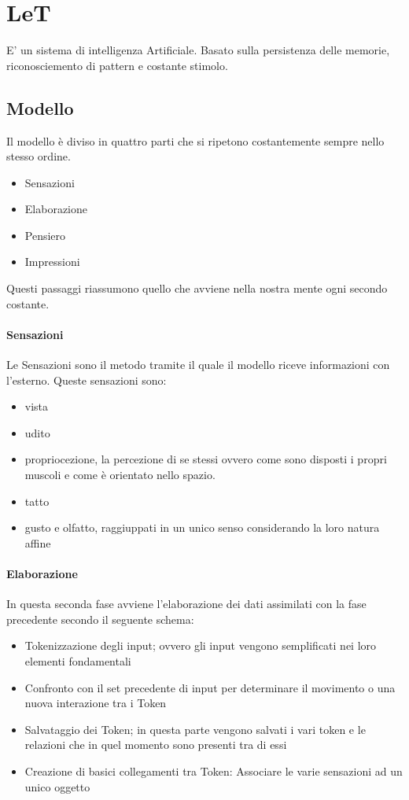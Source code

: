\documentclass{article}
\begin{document}
\section {LeT}
E' un sistema di intelligenza Artificiale. Basato sulla persistenza delle memorie, riconosciemento di pattern e costante stimolo.

\subsection{Modello}
Il modello è diviso in quattro parti che si ripetono costantemente sempre nello stesso ordine.

\begin{itemize}
    \item Sensazioni
    \item Elaborazione
    \item Pensiero
    \item Impressioni
\end{itemize}

Questi passaggi riassumono quello che avviene nella nostra mente ogni secondo costante.

\paragraph{Sensazioni}
Le Sensazioni sono il metodo tramite il quale il modello riceve informazioni con l'esterno. Queste sensazioni sono: 
\begin{itemize}
    \item vista
    \item udito
    \item propriocezione, la percezione di se stessi ovvero come sono disposti i propri muscoli e come è orientato nello spazio.
    \item tatto 
    \item gusto e olfatto, raggiuppati in un unico senso considerando la loro natura affine
\end{itemize}

\paragraph{Elaborazione}
In questa seconda fase avviene l'elaborazione dei dati assimilati con la fase precedente secondo il seguente schema:
\begin{itemize}
    \item Tokenizzazione degli input; ovvero gli input vengono semplificati nei loro elementi fondamentali
    \item Confronto con il set precedente di input per determinare il movimento o una nuova interazione tra i Token
    \item Salvataggio dei Token; in questa parte vengono salvati i vari token e le relazioni che in quel momento sono presenti tra di essi
    \item Creazione di basici collegamenti tra Token: Associare le varie sensazioni ad un unico oggetto
\end{itemize}
\end{document}

